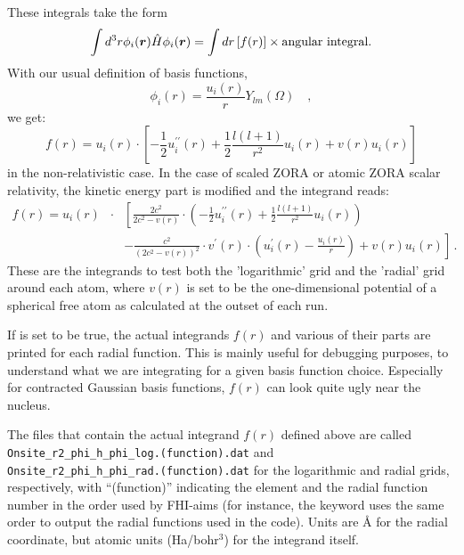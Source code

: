 These integrals take the form
\begin{equation}
 \int d^3r \phi_{i}(\mbox{\boldmath$r$}) \hat{H} \phi_{i}(\mbox{\boldmath$r$}) = \int dr
 \left[ f(r) \right] \times \text{angular integral} .
\end{equation}
With our usual definition of basis functions,
\begin{equation}
  \phi_i(r) = \frac{u_i(r)}{r} Y_{lm}(\Omega) \quad ,
\end{equation}
we get:
\begin{equation}
  f(r) = u_i(r) \cdot \left[ -\frac{1}{2} u_i^{\prime\prime}(r) +
    \frac{1}{2} \frac{l(l+1)}{r^2} u_i(r) + v(r)u_i(r) \right]
\end{equation}
in the non-relativistic case. In the case of scaled ZORA or atomic
ZORA scalar relativity, the kinetic energy part is modified and the
integrand reads:
\begin{eqnarray}
  f(r) = u_i(r) & \cdot & \left [
     \frac{2 c^2}{2
      c^2 - v(r)} \cdot \left( -\frac{1}{2} u_i^{\prime\prime}(r) +
    \frac{1}{2} \frac{l(l+1)}{r^2} u_i(r) \right)  \right. \\ \nonumber
    & \, & \left. - \frac{c^2}{(2 c^2 - v(r))^2} \cdot v^\prime(r)
    \cdot \left(u_i^\prime(r) - \frac{u_i(r)}{r} \right) + v(r)u_i(r) \right] \, .
\end{eqnarray}
These are the integrands to test both the 'logarithmic' grid and the
'radial' grid around each atom, where $v(r)$ is set to be the
one-dimensional potential of a spherical free atom as calculated at
the outset of each run.

If   is set to
be true, the actual integrands $f(r)$ and various of their parts are
printed for each radial function. This is mainly useful for debugging
purposes, to understand what we are integrating for a given basis
function choice. Especially for contracted Gaussian basis functions,
$f(r)$ can look quite ugly near the nucleus.

The files that contain the actual integrand $f(r)$ defined above are
called \\
\texttt{Onsite\_r2\_phi\_h\_phi\_log.(function).dat} and \\
\texttt{Onsite\_r2\_phi\_h\_phi\_rad.(function).dat} for the logarithmic and
radial grids, respectively, with ``(function)'' indicating the element
and the radial function number in the order used by FHI-aims (for
instance, the   keyword uses
the same order to output the radial functions used in the code). Units
are {\AA} for the radial coordinate, but atomic units (Ha/bohr$^3$)
for the integrand itself.

